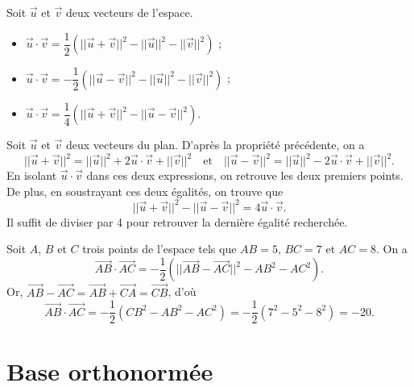 \documentclass[11pt,fleqn, openany]{book} %
\begin{document}
\begin{proposition}Soit $\vec{u}$ et $\vec{v}$ deux vecteurs de l'espace.
\begin{itemize}
\item $\vec{u} \cdot \vec{v}= \dfrac{1}{2}(\lvert\lvert\vec{u}+\vec{v}\rvert\rvert^2-\lvert\lvert\vec{u}\rvert\rvert^2-\lvert\lvert\vec{v}\rvert\rvert^2)$ ;
\item $\vec{u} \cdot \vec{v}= -\dfrac{1}{2}(\lvert\lvert\vec{u}-\vec{v}\rvert\rvert^2-\lvert\lvert\vec{u}\rvert\rvert^2-\lvert\lvert\vec{v}\rvert\rvert^2)$ ;
\item $\vec{u} \cdot \vec{v} = \dfrac{1}{4}( \lvert\lvert\vec{u}+\vec{v}\rvert\rvert^2-\lvert\lvert\vec{u}-\vec{v}\rvert\rvert^2 )$.
\end{itemize}\end{proposition}

\begin{demonstration} Soit $\vec{u}$ et $\vec{v}$ deux vecteurs du plan. D'après la propriété précédente, on a 
\[\lvert\lvert\vec{u}+\vec{v}\rvert\rvert^2=\lvert\lvert\vec{u}\rvert\rvert^2+2\vec{u}\cdot\vec{v}+\lvert\lvert\vec{v}\rvert\rvert^2\quad\text{et}\quad \lvert\lvert\vec{u}-\vec{v}\rvert\rvert^2=\lvert\lvert\vec{u}\rvert\rvert^2-2\vec{u}\cdot\vec{v}+\lvert\lvert\vec{v}\rvert\rvert^2.\]
En isolant $\vec{u}\cdot \vec{v}$ dans ces deux expressions, on retrouve les deux premiers points. De plus, en soustrayant ces deux égalités, on trouve que
\[\lvert\lvert\vec{u}+\vec{v}\rvert\rvert^2-\lvert\lvert\vec{u}-\vec{v}\rvert\rvert^2=4\vec{u}\cdot\vec{v}.\]
Il suffit de diviser par 4 pour retrouver la dernière égalité recherchée.\end{demonstration}

\begin{example}Soit $A$, $B$ et $C$ trois points de l'espace tels que $AB=5$, $BC=7$ et $AC=8$. On a
\[\overrightarrow{AB}\cdot \overrightarrow{AC}=-\dfrac{1}{2}( \lvert\lvert\overrightarrow{AB}-\overrightarrow{AC}\rvert\rvert^2-AB^2-AC^2).\]
Or, $\overrightarrow{AB}-\overrightarrow{AC}=\overrightarrow{AB}+\overrightarrow{CA}=\overrightarrow{CB}$, d'où
\[\overrightarrow{AB}\cdot \overrightarrow{AC}=-\dfrac{1}{2}( CB^2-AB^2-AC^2)=-\dfrac{1}{2}(7^2-5^2-8^2)=-20.\]\vspace{-0.5cm}\end{example}


\section{Base orthonormée}
\end{document}
